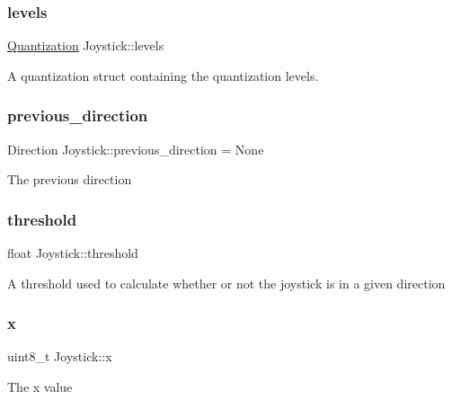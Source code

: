 \subsubsection{\texorpdfstring{levels}{levels}}
{\footnotesize\ttfamily \hyperlink{struct_quantization}{Quantization} Joystick\+::levels\hspace{0.3cm}{\ttfamily [private]}}

A quantization struct containing the quantization levels. \hypertarget{class_joystick_abf9509216c86d03fb76abc7ff4507f90}{}\label{class_joystick_abf9509216c86d03fb76abc7ff4507f90} 
\subsubsection{\texorpdfstring{previous\+\_\+direction}{previous\_direction}}
{\footnotesize\ttfamily Direction Joystick\+::previous\+\_\+direction = None\hspace{0.3cm}{\ttfamily [private]}}

The previous direction \hypertarget{class_joystick_a30b68bce5589674148d43b4854b25cef}{}\label{class_joystick_a30b68bce5589674148d43b4854b25cef} 
\subsubsection{\texorpdfstring{threshold}{threshold}}
{\footnotesize\ttfamily float Joystick\+::threshold\hspace{0.3cm}{\ttfamily [private]}}

A threshold used to calculate whether or not the joystick is in a given direction \hypertarget{class_joystick_abeb4f1563a57266700a48ba5aa49b4cd}{}\label{class_joystick_abeb4f1563a57266700a48ba5aa49b4cd} 
\subsubsection{\texorpdfstring{x}{x}}
{\footnotesize\ttfamily uint8\+\_\+t Joystick\+::x\hspace{0.3cm}{\ttfamily [private]}}

The x value \hypertarget{class_joystick_ace9fd47e90cc88de622f1b8ba7650156}{}\label{class_joystick_ace9fd47e90cc88de622f1b8ba7650156} 
